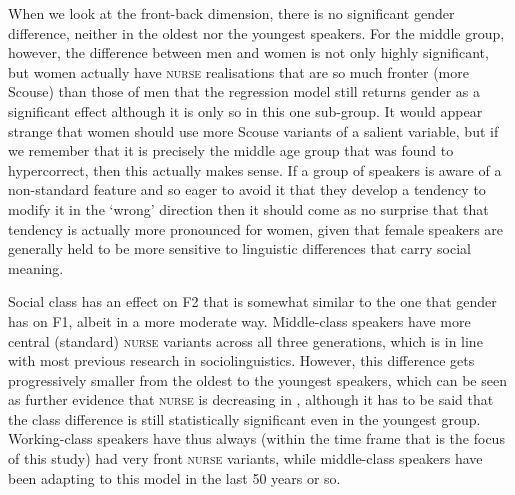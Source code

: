 When we look at the front-back dimension, there is no significant gender difference, neither in the oldest nor the youngest speakers.
For the middle group, however, the difference between men and women is not only highly significant, but women actually have \textsc{nurse} realisations that are so much fronter (more Scouse) than those of men that the regression model still returns gender as a significant effect although it is only so in this one sub-group.
It would appear strange that women should use more Scouse variants of a salient variable, but if we remember that it is precisely the middle age group that was found to hypercorrect, then this actually makes sense.
If a group of speakers is aware of a non-standard feature and so eager to avoid it that they develop a tendency to modify it in the `wrong' direction then it should come as no surprise that that tendency is actually more pronounced for women, given that female speakers are generally held to be more sensitive to linguistic differences that carry social meaning.

Social class has an effect on F2 that is somewhat similar to the one that gender has on F1, albeit in a more moderate way.
Middle-class speakers have more central (standard) \textsc{nurse} variants across all three generations, which is in line with most previous research in sociolinguistics.
However, this difference gets progressively smaller from the oldest to the youngest speakers, which can be seen as further evidence that \textsc{nurse} is decreasing in , although it has to be said that the class difference is still statistically significant even in the youngest group.
Working-class speakers have thus always (within the time frame that is the focus of this study) had very front \textsc{nurse} variants, while middle-class speakers have been adapting to this model in the last 50 years or so.

